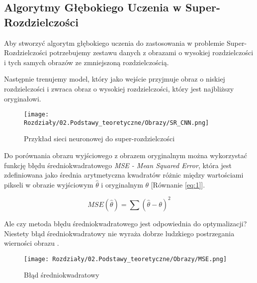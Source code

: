 

\subsection*{Algorytmy Głębokiego Uczenia w Super-Rozdzielczości}

Aby stworzyć algorytm głębokiego uczenia do zastosowania w problemie Super-Rozdzielczości potrzebujemy zestawu danych z obrazami o wysokiej rozdzielczości i tych samych obrazów ze zmniejszoną rozdzielczością.

Następnie trenujemy model, który jako wejście przyjmuje obraz o niskiej rozdzielczości i zwraca obraz o wysokiej rozdzielczości, który jest najbliższy oryginałowi.


\begin{figure}[h]
    \centering
    \texttt{[image: Rozdziały/02.Podstawy\_teoretyczne/Obrazy/SR\_CNN.png]}
    \caption{Przykład sieci neuronowej do super-rozdzielczości}
    \label{fig:image18}
\end{figure}



Do porównania obrazu wyjściowego z obrazem oryginalnym można wykorzystać funkcję błędu średniokwadratowego \textit{MSE - Mean Squared Error}, która jest zdefiniowana jako średnia arytmetyczna kwadratów różnic między wartościami pikseli w obrazie wyjściowym $\hat{\theta }$ i oryginalnym $\theta$ [Równanie \ref{eq:1}].

\begin{equation}
    MSE(\hat{\theta }) = \sum(\hat{\theta } - \theta )^2 \label{eq:1}
\end{equation}

Ale czy metoda błędu średniokwadratowego jest odpowiednia do optymalizacji?
Niestety błąd średniokwadratowy nie wyraża dobrze ludzkiego postrzegania wierności obrazu \cite{4775883}.

\begin{figure}[h]
    \centering
    \texttt{[image: Rozdziały/02.Podstawy\_teoretyczne/Obrazy/MSE.png]}
    \caption{Błąd średniokwadratowy \cite{4775883}}
    \label{fig:image56}
\end{figure}

